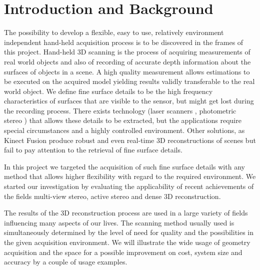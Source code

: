 \documentclass{ucl_thesis}
\begin{document}
\tableofcontents
\listoffigures
\newpage

\setcounter{page}{1}
\pagestyle{plain}

\chapter{Introduction and Background} 

The possibility to develop a flexible, easy to use, relatively environment independent hand-held acquisition process is to be discovered in the frames of this project. Hand-held 3D scanning is the process of acquiring measurements of real world objects and also of recording of accurate depth information about the surfaces of objects in a scene. A high quality measurement allows estimations to be executed on the acquired model yielding results validly transferable to the real world object. We define fine surface details to be the high frequency characteristics of surfaces that are visible to the sensor, but might get lost during the recording process. There exists technology (laser scanners \cite{DiebelThrun05} \cite{Schuon09}, photometric stereo \cite{Nehab05}) that allows these details to be extracted, but the applications require special circumstances and a highly controlled environment. Other solutions, as Kinect Fusion \cite{Izadi11} produce robust and even real-time 3D reconstructions of scenes but fail to pay attention to the retrieval of fine surface details. \\

\par In this project we targeted the acquisition of such fine surface details with any method that allows higher flexibility with regard to the required environment. We started our investigation by evaluating the applicability of recent achievements of the fields multi-view stereo, active stereo and dense 3D reconstruction. 
\par The results of the 3D reconstruction process are used in a large variety of fields influencing many aspects of our lives. The scanning method usually used is simultaneously determined by the level of need for quality and the possibilities in the given acquisition environment. We will illustrate the wide usage of geometry acquisition and the space for a possible improvement on cost, system size and accuracy by a couple of usage examples.
\end{document}
